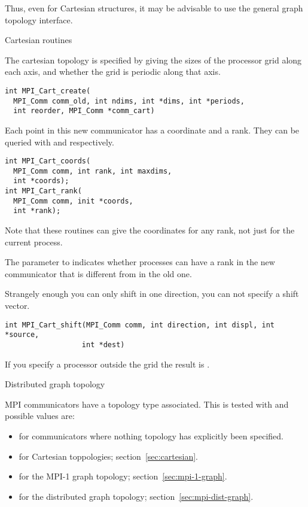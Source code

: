 Thus, even for Cartesian structures, it may be advisable to use the
general graph topology interface.

 {Cartesian routines}

The cartesian topology is specified by giving
 the sizes of the processor grid along
each axis, and whether the grid is periodic along that axis.
\begin{verbatim}
int MPI_Cart_create(
  MPI_Comm comm_old, int ndims, int *dims, int *periods, 
  int reorder, MPI_Comm *comm_cart)
\end{verbatim}
Each point in this new communicator has a coordinate and a rank.  They
can be queried with  and
 respectively.
\begin{verbatim}
int MPI_Cart_coords(
  MPI_Comm comm, int rank, int maxdims,
  int *coords);
int MPI_Cart_rank(
  MPI_Comm comm, init *coords, 
  int *rank);
\end{verbatim}
Note that these routines can give the coordinates for any rank,
not just for the current process.
%

The  parameter to 
indicates whether processes can have a rank
in the new communicator that is different from in the old one.

Strangely enough you can only shift in one direction, you can not
specify a shift vector.
\begin{verbatim}
int MPI_Cart_shift(MPI_Comm comm, int direction, int displ, int *source, 
                  int *dest)
\end{verbatim}
If you specify a processor outside the grid
the result is .

 {Distributed graph topology}
\label{sec:mpi-dist-graph}

MPI communicators have a topology type associated. This is tested with
%
%
and possible values are:
\begin{itemize}
\item {} for communicators where nothing
  topology has explicitly been specified.
\item {} for Cartesian toppologies;
  section~\ref{sec:cartesian}.
\item {} for the MPI-1 graph topology;
  section~\ref{sec:mpi-1-graph}.
\item {} for the distributed graph
  topology; section~\ref{sec:mpi-dist-graph}.
\end{itemize}

